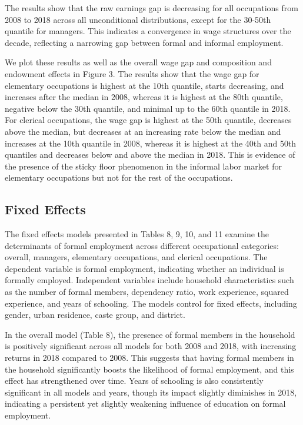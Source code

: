 The results show that the raw earnings gap is decreasing for all occupations from 2008 to 2018 across all unconditional distributions, except for the 30-50th quantile for managers. This indicates a convergence in wage structures over the decade, reflecting a narrowing gap between formal and informal employment.

We plot these results as well as the overall wage gap and composition and endowment effects in Figure 3. The results show that the wage gap for elementary occupations is highest at the 10th quantile, starts decreasing, and increases after the median in 2008, whereas it is highest at the 80th quantile, negative below the 30th quantile, and minimal up to the 60th quantile in 2018. For clerical occupations, the wage gap is highest at the 50th quantile, decreases above the median, but decreases at an increasing rate below the median and increases at the 10th quantile in 2008, whereas it is highest at the 40th and 50th quantiles and decreases below and above the median in 2018. This is evidence of the presence of the sticky floor phenomenon in the informal labor market for elementary occupations but not for the rest of the occupations.
 
 
 \subsection{Fixed Effects}
 The fixed effects models presented in Tables 8, 9, 10, and 11 examine the determinants of formal employment across different occupational categories: overall, managers, elementary occupations, and clerical occupations. The dependent variable is formal employment, indicating whether an individual is formally employed. Independent variables include household characteristics such as the number of formal members, dependency ratio, work experience, squared experience, and years of schooling. The models control for fixed effects, including gender, urban residence, caste group, and district.
 
 In the overall model (Table 8), the presence of formal members in the household is positively significant across all models for both 2008 and 2018, with increasing returns in 2018 compared to 2008. This suggests that having formal members in the household significantly boosts the likelihood of formal employment, and this effect has strengthened over time. Years of schooling is also consistently significant in all models and years, though its impact slightly diminishes in 2018, indicating a persistent yet slightly weakening influence of education on formal employment.
 
